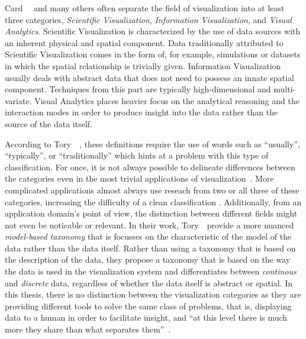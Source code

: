 Card~\etal~\cite{card1999readings} and many others often separate the field of visualization into at least three categories, \emph{Scientific Visualization}, \emph{Information Visualization}, and \emph{Visual Analytics}.  Scientific Visualization is characterized by the use of data sources with an inherent physical and spatial component.  Data traditionally attributed to Scientific Visualization comes in the form of, for example, simulations or datasets in which the spatial relationship is trivially given.  Information Visualization usually deals with abstract data that does not need to possess an innate spatial component.  Techniques from this part are typically high-dimensional and multi-variate.  Visual Analytics places heavier focus on the analytical reasoning and the interaction modes in order to produce insight into the data rather than the source of the data itself.

\noindent According to Tory~\etal~\cite{tory2002model}, these definitions require the use of words such as ``usually'', ``typically'', or ``traditionally'' which hints at a problem with this type of classification.  For once, it is not always possible to delineate differences between the categories even in the most trivial applications of visualization~\cite{rhyne2003information, weiskopf2006scivis}.  More complicated applications almost always use reseach from two or all three of these categories, increasing the difficulty of a clean classification .  Additionally, from an application domain's point of view, the distinction between different fields might not even be noticable or relevant.  In their work, Tory~\etal~provide a more nuanced \emph{model-based taxonomy} that is focusses on the characteristic of the model of the data rather than the data itself.  Rather than using a taxonomy that is based on the description of the data, they propose a taxonomy that is based on the way the data is used in the visualization system and differentiates between \emph{continous} and \emph{discrete} data, regardless of whether the data itself is abstract or spatial.  In this thesis, there is no distinction between the visualization categories as they are providing different tools to solve the same class of problems, that is, displaying data to a human in order to facilitate insight, and ``at this level there is much more they share than what separates them''~\cite{van2006views}.


